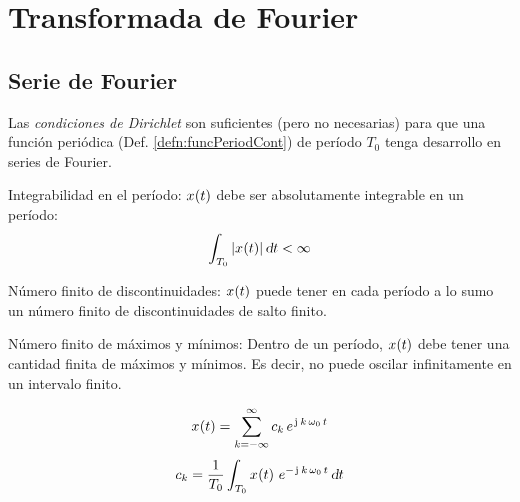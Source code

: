 \chapter{Transformada de Fourier}

\section{Serie de Fourier}

Las \emph{condiciones de Dirichlet} son suficientes (pero no necesarias) para que una función periódica (Def. \ref{defn:funcPeriodCont}) de período $T_0$ tenga desarrollo en series de Fourier.

\begin{numset}
    \begin{numitem}{Integrabilidad en el período:}
        $\fx[x]{t}$ debe ser absolutamente integrable en un período:
        \[
            \int_{T_0} \norm{\fx[x]{t}} \, \dif t < \infty
        \]
    \end{numitem}

    \begin{numitem}{Número finito de discontinuidades:}
        $\fx[x]{t}$ puede tener en cada período a lo sumo un número finito de discontinuidades de salto finito.
    \end{numitem}

    \begin{numitem}{Número finito de máximos y mínimos:}
        Dentro de un período, $\fx[x]{t}$ debe tener una cantidad finita de máximos y mínimos.
        Es decir, no puede oscilar infinitamente en un intervalo finito.
    \end{numitem}
\end{numset}

\begin{mdframed}[style=DefinitionFrame]
    \begin{defn}
        \label{defn:FourierSerieExp}
    \end{defn}
    \[
        \fx[x]{t} = \sum_{\kth=-\infty}^\infty c_\kth \, e^{\iu \, \kth \, \omega_0 \, t}
    \]
    \[
        c_\kth = \frac{1}{T_0} \int_{T_0} \fx[x]{t} \, e^{-\iu \, \kth \, \omega_0 \, t} \, \dif t
    \]
\end{mdframed}

